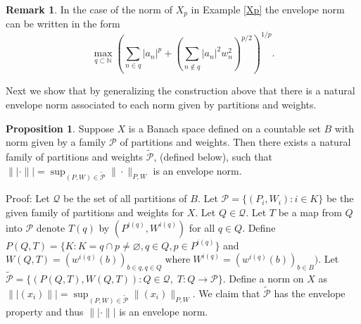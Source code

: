 \documentclass[12pt]{amsart}
\theoremstyle{definition}
\newtheorem{proposition}[theorem]{Proposition}
\newtheorem{remark}[theorem]{Remark}
\theoremstyle{remark}
\numberwithin{equation}{section}
\begin{document}
\begin{remark} In the case of the norm  of $X_p$ in Example \ref{Xp}
the envelope norm can be written in the form
$$\max_{q\subset \mathbb N} \left( \sum_{n\in q} |a_n|^p +(\sum_{n \notin q}
|a_n|^2 w_n^2)^{p/2} \right )^{1/p}.$$
\end{remark}

Next we show that by generalizing the construction above that there is 
a natural envelope norm associated to each norm given by partitions
and weights.

\begin{proposition}
\label{existence}
Suppose $X$ is a Banach space defined on a countable set $B$ with norm
 given by a family $\mathcal{P}$ of partitions and weights. Then there
 exists a natural family of partitions and weights
 $\tilde{\mathcal{P}}$, (defined below), such that
 $\||\cdot\||= \sup_{(P,W)\in \tilde{\mathcal{P}}}
 \|\cdot\|_{P,W}$
 is an envelope norm.
\end{proposition}

Proof: Let $\mathcal{Q}$ be the set of all partitions of $B$.
Let ${\mathcal{P}}=\{(P_i, W_i): i\in K\}$ be the given family of 
partitions and weights for $X$.
Let $Q\in \mathcal{Q}$. Let $T$ be a map from $Q$ into 
 $\mathcal{P}$ denote  $T(q)$ by $(P^{i(q)}, W^{i(q)})$ for all $q \in Q$.
 Define 
$P(Q,T)=\{K: K=q\cap p\neq \varnothing, q\in Q, p \in P^{i(q)}\}$ and
$W(Q,T)=(w^{i(q)}(b))_{b\in q, q\in Q} \; \text{where}\; 
 W^{i(q)}=(w^{i(q)}(b))_{b\in B})$.
Let $\tilde{\mathcal{P}}=\{ (P(Q,T), W(Q,T)): Q\in {\mathcal{Q}},\;
 T: Q\rightarrow \mathcal{P}\}$.
Define a norm on $X$ as $\|| (x_i)\|| = \sup_{(P,W)\in 
\tilde{\mathcal{P}}} \|(x_i)\|_{P,W}$.
We claim that $\tilde{\mathcal{P}}$ has the envelope property and thus
$\||\cdot\||$ is an envelope norm.
\end{document}
